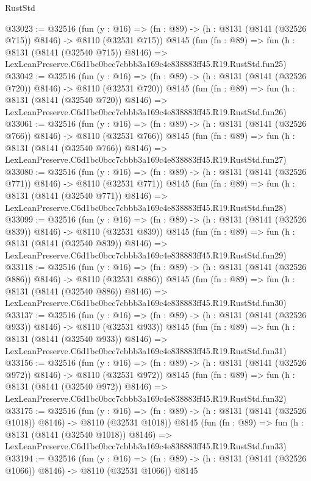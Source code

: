 \begin{lexlean}{RustStd}
\begin{coremodule}
@33023 := @32516
    (fun (y : @16) => (fn : @89) -> (h : @8131 (@8141 (@32526 @715)) @8146) -> @8110 (@32531 @715))
    @8145
    (fun (fn : @89) =>
    fun (h : @8131 (@8141 (@32540 @715)) @8146) =>
    LexLeanPreserve.C6d1bc0bcc7cbbb3a169c4e838883ff45.R19.RustStd.fun25)
@33042 := @32516
    (fun (y : @16) => (fn : @89) -> (h : @8131 (@8141 (@32526 @720)) @8146) -> @8110 (@32531 @720))
    @8145
    (fun (fn : @89) =>
    fun (h : @8131 (@8141 (@32540 @720)) @8146) =>
    LexLeanPreserve.C6d1bc0bcc7cbbb3a169c4e838883ff45.R19.RustStd.fun26)
@33061 := @32516
    (fun (y : @16) => (fn : @89) -> (h : @8131 (@8141 (@32526 @766)) @8146) -> @8110 (@32531 @766))
    @8145
    (fun (fn : @89) =>
    fun (h : @8131 (@8141 (@32540 @766)) @8146) =>
    LexLeanPreserve.C6d1bc0bcc7cbbb3a169c4e838883ff45.R19.RustStd.fun27)
@33080 := @32516
    (fun (y : @16) => (fn : @89) -> (h : @8131 (@8141 (@32526 @771)) @8146) -> @8110 (@32531 @771))
    @8145
    (fun (fn : @89) =>
    fun (h : @8131 (@8141 (@32540 @771)) @8146) =>
    LexLeanPreserve.C6d1bc0bcc7cbbb3a169c4e838883ff45.R19.RustStd.fun28)
@33099 := @32516
    (fun (y : @16) => (fn : @89) -> (h : @8131 (@8141 (@32526 @839)) @8146) -> @8110 (@32531 @839))
    @8145
    (fun (fn : @89) =>
    fun (h : @8131 (@8141 (@32540 @839)) @8146) =>
    LexLeanPreserve.C6d1bc0bcc7cbbb3a169c4e838883ff45.R19.RustStd.fun29)
@33118 := @32516
    (fun (y : @16) => (fn : @89) -> (h : @8131 (@8141 (@32526 @886)) @8146) -> @8110 (@32531 @886))
    @8145
    (fun (fn : @89) =>
    fun (h : @8131 (@8141 (@32540 @886)) @8146) =>
    LexLeanPreserve.C6d1bc0bcc7cbbb3a169c4e838883ff45.R19.RustStd.fun30)
@33137 := @32516
    (fun (y : @16) => (fn : @89) -> (h : @8131 (@8141 (@32526 @933)) @8146) -> @8110 (@32531 @933))
    @8145
    (fun (fn : @89) =>
    fun (h : @8131 (@8141 (@32540 @933)) @8146) =>
    LexLeanPreserve.C6d1bc0bcc7cbbb3a169c4e838883ff45.R19.RustStd.fun31)
@33156 := @32516
    (fun (y : @16) => (fn : @89) -> (h : @8131 (@8141 (@32526 @972)) @8146) -> @8110 (@32531 @972))
    @8145
    (fun (fn : @89) =>
    fun (h : @8131 (@8141 (@32540 @972)) @8146) =>
    LexLeanPreserve.C6d1bc0bcc7cbbb3a169c4e838883ff45.R19.RustStd.fun32)
@33175 := @32516
    (fun (y : @16) =>
    (fn : @89) -> (h : @8131 (@8141 (@32526 @1018)) @8146) -> @8110 (@32531 @1018))
    @8145
    (fun (fn : @89) =>
    fun (h : @8131 (@8141 (@32540 @1018)) @8146) =>
    LexLeanPreserve.C6d1bc0bcc7cbbb3a169c4e838883ff45.R19.RustStd.fun33)
@33194 := @32516
    (fun (y : @16) =>
    (fn : @89) -> (h : @8131 (@8141 (@32526 @1066)) @8146) -> @8110 (@32531 @1066))
    @8145

\end{coremodule}
\end{lexlean}

